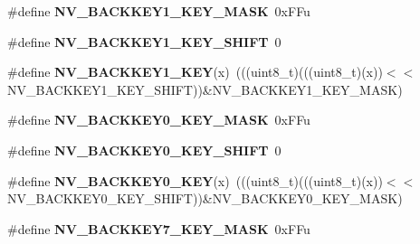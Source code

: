\begin{DoxyCompactItemize}
\item 
\mbox{\label{group___n_v___register___masks_ga6cd05d78b113df7f3cb0d11d29931666}} 
\#define {\bfseries N\+V\+\_\+\+B\+A\+C\+K\+K\+E\+Y1\+\_\+\+K\+E\+Y\+\_\+\+M\+A\+SK}~0x\+F\+Fu
\item 
\mbox{\label{group___n_v___register___masks_ga71418f17e11f902066ca404fbe473aef}} 
\#define {\bfseries N\+V\+\_\+\+B\+A\+C\+K\+K\+E\+Y1\+\_\+\+K\+E\+Y\+\_\+\+S\+H\+I\+FT}~0
\item 
\mbox{\label{group___n_v___register___masks_gac336f640b5b887647407bd036aabb060}} 
\#define {\bfseries N\+V\+\_\+\+B\+A\+C\+K\+K\+E\+Y1\+\_\+\+K\+EY}(x)~(((uint8\+\_\+t)(((uint8\+\_\+t)(x))$<$$<$N\+V\+\_\+\+B\+A\+C\+K\+K\+E\+Y1\+\_\+\+K\+E\+Y\+\_\+\+S\+H\+I\+FT))\&N\+V\+\_\+\+B\+A\+C\+K\+K\+E\+Y1\+\_\+\+K\+E\+Y\+\_\+\+M\+A\+SK)
\item 
\mbox{\label{group___n_v___register___masks_gafa0e31ca33d445d47d2fd89785e4ec9b}} 
\#define {\bfseries N\+V\+\_\+\+B\+A\+C\+K\+K\+E\+Y0\+\_\+\+K\+E\+Y\+\_\+\+M\+A\+SK}~0x\+F\+Fu
\item 
\mbox{\label{group___n_v___register___masks_ga381e2b0a778da31fa6c795550e71aed8}} 
\#define {\bfseries N\+V\+\_\+\+B\+A\+C\+K\+K\+E\+Y0\+\_\+\+K\+E\+Y\+\_\+\+S\+H\+I\+FT}~0
\item 
\mbox{\label{group___n_v___register___masks_ga1806932e2ff643e0bd9d9718dd0921a4}} 
\#define {\bfseries N\+V\+\_\+\+B\+A\+C\+K\+K\+E\+Y0\+\_\+\+K\+EY}(x)~(((uint8\+\_\+t)(((uint8\+\_\+t)(x))$<$$<$N\+V\+\_\+\+B\+A\+C\+K\+K\+E\+Y0\+\_\+\+K\+E\+Y\+\_\+\+S\+H\+I\+FT))\&N\+V\+\_\+\+B\+A\+C\+K\+K\+E\+Y0\+\_\+\+K\+E\+Y\+\_\+\+M\+A\+SK)
\item 
\mbox{\label{group___n_v___register___masks_gac3f2bc7dd55b7951d70a5d1fcb6552b8}} 
\#define {\bfseries N\+V\+\_\+\+B\+A\+C\+K\+K\+E\+Y7\+\_\+\+K\+E\+Y\+\_\+\+M\+A\+SK}~0x\+F\+Fu
\item 
\mbox{\label{group___n_v___register___masks_gad6bef74e61e792dfa5b7d195e4ce5620}} 

\end{DoxyCompactItemize}
